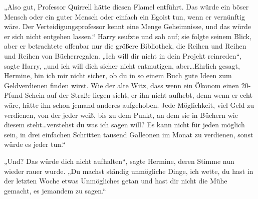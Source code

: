 „Also gut, Professor Quirrell hätte diesen Flamel entführt. Das würde ein böser Mensch oder ein guter Mensch oder einfach ein Egoist tun, wenn er vernünftig wäre. Der Verteidigungsprofessor kennt eine Menge Geheimnisse, und das würde er sich nicht entgehen lassen.“
Harry seufzte und sah auf; sie folgte seinem Blick, aber er betrachtete offenbar nur die größere Bibliothek, die Reihen und Reihen und Reihen von Bücherregalen.
„Ich will dir nicht in dein Projekt reinreden“, sagte Harry, „und ich will dich sicher nicht entmutigen, aber…Ehrlich gesagt, Hermine, bin ich mir nicht sicher, ob du in so einem Buch gute Ideen zum Geldverdienen finden wirst. Wie der alte Witz, dass wenn ein Ökonom einen 20-Pfund-Schein auf der Straße liegen sieht, er ihn nicht aufhebt, denn wenn er echt wäre, hätte ihn schon jemand anderes aufgehoben. Jede Möglichkeit, viel Geld zu verdienen, von der jeder weiß, bis zu dem Punkt, an dem sie in Büchern wie diesem steht…verstehst du was ich sagen will? Es kann nicht für jeden möglich sein, in drei einfachen Schritten tausend Galleonen im Monat zu verdienen, sonst würde es jeder tun.“

„Und? Das würde dich nicht aufhalten“, sagte Hermine, deren Stimme nun wieder rauer wurde. „Du machst ständig unmögliche Dinge, ich wette, du hast in der letzten Woche etwas Unmögliches getan und hast dir nicht die Mühe gemacht, es jemandem zu sagen.“

